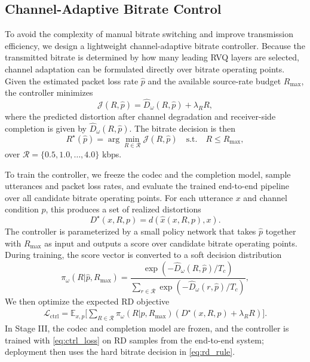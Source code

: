 \documentclass[conference]{IEEEtran}
\begin{document}
\subsection{Channel-Adaptive Bitrate Control}
To avoid the complexity of manual bitrate switching and improve transmission efficiency, we design a lightweight channel-adaptive bitrate controller. Because the transmitted bitrate is determined by how many leading RVQ layers are selected, channel adaptation can be formulated directly over bitrate operating points. Given the estimated packet loss rate $\hat{p}$ and the available source-rate budget $R_{\max}$, the controller minimizes
\begin{equation}
\mathcal{J}(R,\hat{p})=\hat{D}_{\omega}(R,\hat{p})+\lambda_R R,
\label{eq:rd_cost}
\end{equation}
where the predicted distortion after channel degradation and receiver-side completion is given by $\hat{D}_{\omega}(R,\hat{p})$. The bitrate decision is then
\begin{equation}
R^{\star}(\hat{p})=\arg\min_{R\in\mathcal{R}} \mathcal{J}(R,\hat{p})
\quad \text{s.t.}\quad R\le R_{\max},
\label{eq:rd_rule}
\end{equation}
over $\mathcal{R}=\{0.5,1.0,\ldots,4.0\}$ kbps.

To train the controller, we freeze the codec and the completion model, sample utterances and packet loss rates, and evaluate the trained end-to-end pipeline over all candidate bitrate operating points. For each utterance $x$ and channel condition $p$, this produces a set of realized distortions
\begin{equation}
D^{\star}(x,R,p)=d\!\left(\hat{x}(x,R,p),x\right).
\end{equation}
The controller is parameterized by a small policy network that takes $\hat{p}$ together with $R_{\max}$ as input and outputs a score over candidate bitrate operating points. During training, the score vector is converted to a soft decision distribution
\begin{equation}
\pi_{\omega}(R|\hat{p},R_{\max})=\frac{\exp(-\hat{D}_{\omega}(R,\hat{p})/T_c)}{\sum_{r\in\mathcal{R}}\exp(-\hat{D}_{\omega}(r,\hat{p})/T_c)},
\end{equation}
We then optimize the expected RD objective
\begin{equation}
\begin{aligned}
\mathcal{L}_{\mathrm{ctrl}}
=\mathbb{E}_{x,p}\!\Big[
\sum_{R\in\mathcal{R}}\pi_{\omega}(R|p,R_{\max})
\left(D^{\star}(x,R,p)+\lambda_R R\right)
\Big].
\end{aligned}
\label{eq:ctrl_loss}
\end{equation}
In Stage III, the codec and completion model are frozen, and the controller is trained with \eqref{eq:ctrl_loss} on RD samples from the end-to-end system; deployment then uses the hard bitrate decision in \eqref{eq:rd_rule}.
\end{document}
